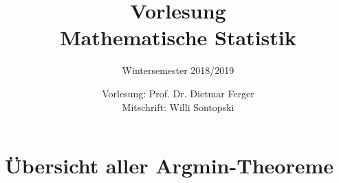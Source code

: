 \documentclass[]{scrreprt}
\title{
  Vorlesung\\
  Mathematische Statistik \\
  }
\subtitle{Wintersemester 2018/2019}
\author{
	Vorlesung: Prof. Dr. Dietmar Ferger\\
	Mitschrift: Willi Sontopski
}
\begin{document}
	\makeatletter
  	\renewcommand{\@pnumwidth}{2em}
  	\makeatother

	\maketitle
	\doclicenseThis
	\tableofcontents        %

	
	
	
	
	
	
	
	
	
	
	
	\appendix
	\chapter{Übersicht aller Argmin-Theoreme}
		
	
	

	\listoffigures 
	
	\nocite{*} %
	
\end{document}
